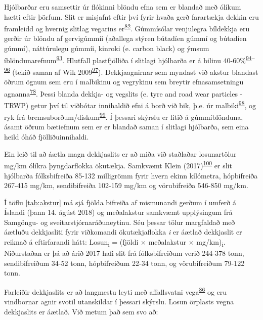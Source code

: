 \documentclass[icelandic,]{book}
\begin{document}
Hjólbarðar eru samsettir úr flókinni blöndu efna sem er blandað með ólíkum hætti eftir þörfum. Slit er misjafnt eftir því fyrir hvaða gerð farartækja dekkin eru framleidd og hvernig slitlag vegarins er\textsuperscript{\protect\hyperlink{ref-grigoratos2014non}{82}}. Gúmmísólar venjulegra bíldekkja eru gerðir úr blöndu af gervigúmmíi (aðallega stýren bútadíen gúmmí og bútadíen gúmmí), náttúrulegu gúmmíi, kinroki (e. carbon black) og ýmsum íblöndunarefnum\textsuperscript{\protect\hyperlink{ref-Evans2006}{93}}. Hlutfall plastfjölliða í slitlagi hjólbarða er á bilinu 40-60\%\textsuperscript{\protect\hyperlink{ref-Redondo-hasselerharm2018}{94}--\protect\hyperlink{ref-barbin1994science}{96}} (tekið saman af Wik 2009\textsuperscript{\protect\hyperlink{ref-Wik2009}{97}}). Dekkjaagnirnar sem myndast við akstur blandast öðrum ögnum sem eru í malbikinu og vegrykinu sem breytir efnasamsetningu agnanna\textsuperscript{\protect\hyperlink{ref-kreider2010physical}{78}}. Þessi blanda dekkja- og vegslits (e. tyre and road wear particles - TRWP) getur því til viðbótar innihaldið efni á borð við bik, þ.e. úr malbiki\textsuperscript{\protect\hyperlink{ref-fauser2002tire}{98}}, og ryk frá bremsuborðum/diskum\textsuperscript{\protect\hyperlink{ref-kwak2013characterization}{99}}. Í þessari skýrslu er litið á gúmmíblönduna, ásamt öðrum bætiefnum sem er er blandað saman í slitlagi hjólbarða, sem eina heild óháð fjölliðuinnihaldi.

Ein leið til að áætla magn dekkjaslits er að miða við staðlaðar losunartölur mg/km ólíkra þyngdarflokka ökutækja. Samkvæmt Klein (2017)\textsuperscript{\protect\hyperlink{ref-klein2017methods}{100}} er slit hjólbarða fólksbifreiða 85-132 milligrömm fyrir hvern ekinn kílómetra, hópbifreiða 267-415 mg/km, sendibifreiða 102-159 mg/km og vörubifreiða 546-850 mg/km.

Í töflu \ref{tab:akstur} má sjá fjölda bifreiða af mismunandi gerðum í umferð á Íslandi (þann 14. ágúst 2018) og meðalakstur samkvæmt upplýsingum frá Samgöngu- og sveitarstjórnaráðuneytinu. Séu þessar tölur margfaldað með áætluðu dekkjasliti fyrir viðkomandi ökutækjaflokka \emph{i} er áætlað dekkjaslit er reiknað á eftirfarandi hátt: Losun\textsubscript{i} = (fjöldi × meðalakstur × mg/km)\textsubscript{i}. Niðurstaðan er þá að árið 2017 hafi slit frá fólksbifreiðum verið 244-378 tonn, sendibifreiðum 34-52 tonn, hópbifreiðum 22-34 tonn, og vörubifreiðum 79-122 tonn.

Farleiðir dekkjaslits er að langmestu leyti með affallsvatni vega\textsuperscript{\protect\hyperlink{ref-Verschoor2016}{86}} og eru vindbornar agnir svotil utanskildar í þessari skýrslu. Losun örplasts vegna dekkjaslits er áætlað. Við metum það sem svo að:
\end{document}
